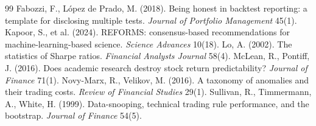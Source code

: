 \documentclass[11pt]{article}
\begin{document}
\begin{thebibliography}{99}
 Fabozzi, F., L\'opez de Prado, M. (2018).
Being honest in backtest reporting: a template for disclosing multiple tests. \emph{Journal of
Portfolio Management} 45(1).
 Kapoor, S., et al. (2024). REFORMS: consensus-based
recommendations for machine-learning-based science. \emph{Science Advances} 10(18).
 Lo, A. (2002). The statistics of Sharpe ratios. \emph{Financial
Analysts Journal} 58(4).
 McLean, R., Pontiff, J. (2016). Does academic
research destroy stock return predictability? \emph{Journal of Finance} 71(1).
 Novy-Marx, R., Velikov, M. (2016). A taxonomy of
anomalies and their trading costs. \emph{Review of Financial Studies} 29(1).
 Sullivan, R., Timmermann, A., White, H. (1999).
Data-snooping, technical trading rule performance, and the bootstrap. \emph{Journal of Finance}
54(5).
\end{thebibliography}
\end{document}
